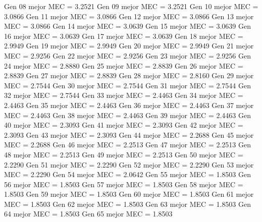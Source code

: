 Gen 08 mejor MEC = 3.2521
Gen 09 mejor MEC = 3.2521
Gen 10 mejor MEC = 3.0866
Gen 11 mejor MEC = 3.0866
Gen 12 mejor MEC = 3.0866
Gen 13 mejor MEC = 3.0866
Gen 14 mejor MEC = 3.0639
Gen 15 mejor MEC = 3.0639
Gen 16 mejor MEC = 3.0639
Gen 17 mejor MEC = 3.0639
Gen 18 mejor MEC = 2.9949
Gen 19 mejor MEC = 2.9949
Gen 20 mejor MEC = 2.9949
Gen 21 mejor MEC = 2.9256
Gen 22 mejor MEC = 2.9256
Gen 23 mejor MEC = 2.9256
Gen 24 mejor MEC = 2.8880
Gen 25 mejor MEC = 2.8839
Gen 26 mejor MEC = 2.8839
Gen 27 mejor MEC = 2.8839
Gen 28 mejor MEC = 2.8160
Gen 29 mejor MEC = 2.7544
Gen 30 mejor MEC = 2.7544
Gen 31 mejor MEC = 2.7544
Gen 32 mejor MEC = 2.7544
Gen 33 mejor MEC = 2.4463
Gen 34 mejor MEC = 2.4463
Gen 35 mejor MEC = 2.4463
Gen 36 mejor MEC = 2.4463
Gen 37 mejor MEC = 2.4463
Gen 38 mejor MEC = 2.4463
Gen 39 mejor MEC = 2.4463
Gen 40 mejor MEC = 2.3093
Gen 41 mejor MEC = 2.3093
Gen 42 mejor MEC = 2.3093
Gen 43 mejor MEC = 2.3093
Gen 44 mejor MEC = 2.2688
Gen 45 mejor MEC = 2.2688
Gen 46 mejor MEC = 2.2513
Gen 47 mejor MEC = 2.2513
Gen 48 mejor MEC = 2.2513
Gen 49 mejor MEC = 2.2513
Gen 50 mejor MEC = 2.2290
Gen 51 mejor MEC = 2.2290
Gen 52 mejor MEC = 2.2290
Gen 53 mejor MEC = 2.2290
Gen 54 mejor MEC = 2.0642
Gen 55 mejor MEC = 1.8503
Gen 56 mejor MEC = 1.8503
Gen 57 mejor MEC = 1.8503
Gen 58 mejor MEC = 1.8503
Gen 59 mejor MEC = 1.8503
Gen 60 mejor MEC = 1.8503
Gen 61 mejor MEC = 1.8503
Gen 62 mejor MEC = 1.8503
Gen 63 mejor MEC = 1.8503
Gen 64 mejor MEC = 1.8503
Gen 65 mejor MEC = 1.8503

